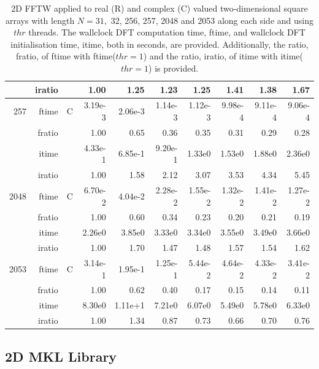 \documentclass[a4paper]{article}
\begin{document}
\begin{table}
\begin{center}
\begin{tabular}{|r|r|r|r|r|r|r|r|r|r|}
     & iratio & &       1.00 &   1.25 &   1.23 &   1.25 &   1.41 &   1.38 &   1.67      \\ \hline 
   257  & ftime & C  &  3.19e-3 &   2.06e-3 &   1.14e-3 &   1.12e-3 &   9.98e-4 &   9.11e-4 &   9.06e-4   \\ 
      & fratio & &      1.00 &   0.65 &   0.36 &   0.35 &   0.31 &   0.29 &   0.28     \\ 
     & itime & &        4.33e-1 &   6.85e-1 &   9.20e-1 &   1.33e0 &   1.53e0 &   1.88e0 &   2.36e0     \\ 
     & iratio & &       1.00 &   1.58 &   2.12 &   3.07 &   3.53 &   4.34 &   5.45      \\ \hline 
  2048  & ftime & C  &  6.70e-2 &   4.04e-2 &   2.28e-2 &   1.55e-2 &   1.32e-2 &   1.41e-2 &   1.27e-2   \\ 
      & fratio & &      1.00 &   0.60 &   0.34 &   0.23 &   0.20 &   0.21 &   0.19     \\ 
     & itime & &        2.26e0 &   3.85e0 &   3.33e0 &   3.34e0 &   3.55e0 &   3.49e0 &   3.66e0     \\ 
     & iratio & &       1.00 &   1.70 &   1.47 &   1.48 &   1.57 &   1.54 &   1.62      \\ \hline 
  2053  & ftime & C  &  3.14e-1 &   1.95e-1 &   1.25e-1 &   5.44e-2 &   4.64e-2 &   4.33e-2 &   3.41e-2   \\ 
      & fratio & &      1.00 &   0.62 &   0.40 &   0.17 &   0.15 &   0.14 &   0.11     \\ 
     & itime & &        8.30e0 &   1.11e+1 &   7.21e0 &   6.07e0 &   5.49e0 &   5.78e0 &   6.33e0     \\ 
     & iratio & &       1.00 &   1.34 &   0.87 &   0.73 &   0.66 &   0.70 &   0.76      \\ \hline \hline
\end{tabular}
\caption{2D FFTW applied to real (R) and complex (C) valued two-dimensional square arrays with length $N=31,$ 32, 256, 257, 2048 and 2053 along each side and using $thr$ threads. The wallclock DFT computation time, ftime, and wallclock DFT initialisation time, itime, both in seconds, are provided. Additionally,  the ratio, fratio, of ftime  with ftime($thr=1$) and the ratio, iratio, of itime  with itime($thr=1$) is provided. }\label{Tbl:FFTW2d}
\end{center}
\end{table}

\subsection{2D MKL Library}\label{Sec:2DMKL}
\end{document}
